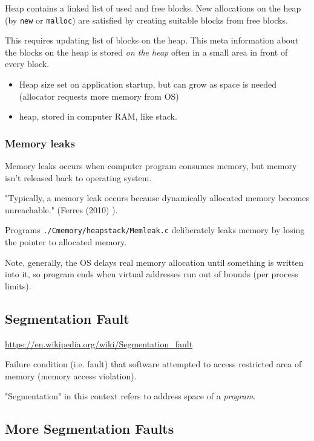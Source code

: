 \documentclass[10pt]{amsart}
\begin{document}
\begin{multicols*}{2}
Heap contains a linked list of used and free blocks.  New allocations on the heap (by \verb|new| or \verb|malloc|) are satisfied by creating suitable blocks from free blocks.  

This requires updating list of blocks on the heap.  This meta information about the blocks on the heap is stored \emph{on the heap} often in a small area in front of every block.  

\begin{itemize}
	\item Heap size set on application startup, but can grow as space is needed (allocator requests more memory from OS)
	\item heap, stored in computer RAM, like stack.
\end{itemize}

\subsubsection{Memory leaks}  

Memory leaks occurs when computer program consumes memory, but memory isn't released back to operating system.  

"Typically, a memory leak occurs because dynamically allocated memory becomes unreachable."  (Ferres (2010) \cite{Ferr2010}).  

Programs \verb|./Cmemory/heapstack/Memleak.c| deliberately leaks memory by losing the pointer to allocated memory.  

Note, generally, the OS delays real memory allocation until something is written into it, so program ends when virtual addresses run out of bounds (per process limits).  

\subsection{Segmentation Fault}

\url{https://en.wikipedia.org/wiki/Segmentation_fault}

Failure condition (i.e. fault) that software attempted to access restricted area of memory (memory access violation).

"Segmentation" in this context refers to address space of a \emph{program}.



\subsection{More Segmentation Faults}  


\end{multicols*}
\end{document}
